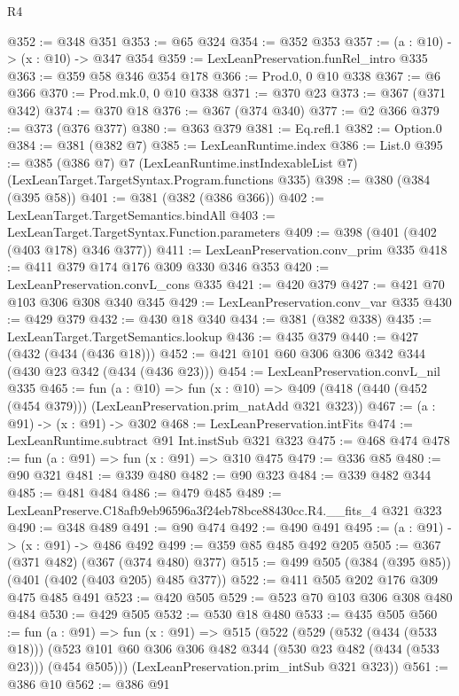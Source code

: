 \begin{lexlean}{R4}
\begin{coremodule}
@352 := @348 @351
@353 := @65 @324
@354 := @352 @353
@357 := (a : @10) -> (x : @10) -> @347 @354
@359 := LexLeanPreservation.funRel_intro @335
@363 := @359 @58 @346 @354 @178
@366 := Prod.{0, 0} @10 @338
@367 := @6 @366
@370 := Prod.mk.{0, 0} @10 @338
@371 := @370 @23
@373 := @367 (@371 @342)
@374 := @370 @18
@376 := @367 (@374 @340)
@377 := @2 @366
@379 := @373 (@376 @377)
@380 := @363 @379
@381 := Eq.refl.{1}
@382 := Option.{0}
@384 := @381 (@382 @7)
@385 := LexLeanRuntime.index
@386 := List.{0}
@395 := @385
    (@386 @7)
    @7
    (LexLeanRuntime.instIndexableList @7)
    (LexLeanTarget.TargetSyntax.Program.functions @335)
@398 := @380 (@384 (@395 @58))
@401 := @381 (@382 (@386 @366))
@402 := LexLeanTarget.TargetSemantics.bindAll
@403 := LexLeanTarget.TargetSyntax.Function.parameters
@409 := @398 (@401 (@402 (@403 @178) @346 @377))
@411 := LexLeanPreservation.conv_prim @335
@418 := @411 @379 @174 @176 @309 @330 @346 @353
@420 := LexLeanPreservation.convL_cons @335
@421 := @420 @379
@427 := @421 @70 @103 @306 @308 @340 @345
@429 := LexLeanPreservation.conv_var @335
@430 := @429 @379
@432 := @430 @18 @340
@434 := @381 (@382 @338)
@435 := LexLeanTarget.TargetSemantics.lookup
@436 := @435 @379
@440 := @427 (@432 (@434 (@436 @18)))
@452 := @421 @101 @60 @306 @306 @342 @344 (@430 @23 @342 (@434 (@436 @23)))
@454 := LexLeanPreservation.convL_nil @335
@465 := fun (a : @10) =>
  fun (x : @10) => @409 (@418 (@440 (@452 (@454 @379))) (LexLeanPreservation.prim_natAdd @321 @323))
@467 := (a : @91) -> (x : @91) -> @302
@468 := LexLeanPreservation.intFits
@474 := LexLeanRuntime.subtract @91 Int.instSub @321 @323
@475 := @468 @474
@478 := fun (a : @91) => fun (x : @91) => @310 @475
@479 := @336 @85
@480 := @90 @321
@481 := @339 @480
@482 := @90 @323
@484 := @339 @482 @344
@485 := @481 @484
@486 := @479 @485
@489 := LexLeanPreserve.C18afb9eb96596a3f24eb78bce88430cc.R4.__fits_4 @321 @323
@490 := @348 @489
@491 := @90 @474
@492 := @490 @491
@495 := (a : @91) -> (x : @91) -> @486 @492
@499 := @359 @85 @485 @492 @205
@505 := @367 (@371 @482) (@367 (@374 @480) @377)
@515 := @499 @505 (@384 (@395 @85)) (@401 (@402 (@403 @205) @485 @377))
@522 := @411 @505 @202 @176 @309 @475 @485 @491
@523 := @420 @505
@529 := @523 @70 @103 @306 @308 @480 @484
@530 := @429 @505
@532 := @530 @18 @480
@533 := @435 @505
@560 := fun (a : @91) =>
  fun (x : @91) =>
  @515
    (@522
      (@529
        (@532 (@434 (@533 @18)))
        (@523 @101 @60 @306 @306 @482 @344 (@530 @23 @482 (@434 (@533 @23))) (@454 @505)))
      (LexLeanPreservation.prim_intSub @321 @323))
@561 := @386 @10
@562 := @386 @91

\end{coremodule}
\end{lexlean}
